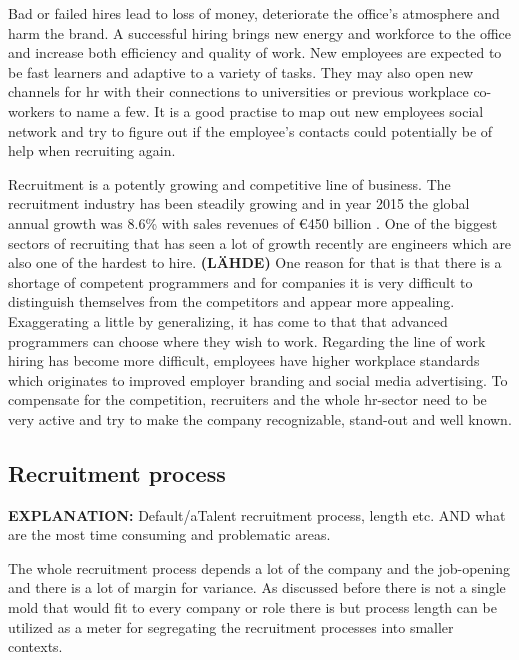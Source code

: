 \documentclass[11pt,a4paper,oneside,article]{memoir}
\begin{document}
Bad or failed hires lead to loss of money, deteriorate the office's atmosphere and harm the brand. A successful hiring brings new energy and workforce to the office and increase both efficiency and quality of work. New employees are expected to be fast learners and adaptive to a variety of tasks. \cite[p.~100]{viitala:book} They may also open new channels for \gls{hr} with their connections to universities or previous workplace co-workers to name a few. It is a good practise to map out new employees social network and try to figure out if the employee's contacts could potentially be of help when recruiting again.

Recruitment is a potently growing and competitive line of business. The recruitment industry has been steadily growing and in year 2015 the global annual growth was 8.6\% with sales revenues of €450 billion \cite{ciett:economic}. One of the biggest sectors of recruiting that has seen a lot of growth recently are engineers which are also one of the hardest to hire. \textbf{(LÄHDE)} One reason for that is that there is a shortage of competent programmers and for companies it is very difficult to distinguish themselves from the competitors and appear more appealing. Exaggerating a little by generalizing, it has come to that that %
advanced programmers can choose where they wish to work. Regarding the line of work hiring has become more difficult, employees have higher workplace standards which originates to improved employer branding and social media advertising. To compensate for the competition, recruiters and the whole \gls{hr}-sector need to be very active and try to make the company recognizable, stand-out and well known.

\subsection{Recruitment process}
\textbf{EXPLANATION:} Default/aTalent recruitment process, length etc. AND what are the most time consuming and problematic areas.

The whole recruitment process depends a lot of the company and the job-opening and there is a lot of margin for variance. As discussed before there is not a single mold that would fit to every company or role there is but process length can be utilized as a meter for segregating the recruitment processes into smaller contexts.
\end{document}
